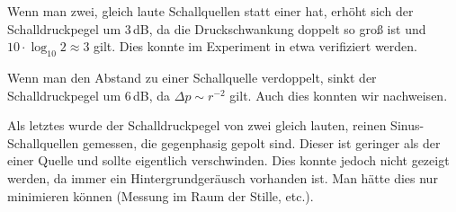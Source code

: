 \documentclass[12pt,a4paper,headinclude,bibtotoc]{scrartcl}
\begin{document}
Wenn man zwei, gleich laute Schallquellen statt einer hat, erhöht sich der Schalldruckpegel um $3\,$dB, da die Druckschwankung doppelt so groß ist und $10\cdot\log_{10} 2 \approx 3$ gilt.
Dies konnte im Experiment in etwa verifiziert werden.

Wenn man den Abstand zu einer Schallquelle verdoppelt, sinkt der Schalldruckpegel um $6\,$dB, da $\Delta p \sim r^{-2}$ gilt.
Auch dies konnten wir nachweisen.

Als letztes wurde der Schalldruckpegel von zwei gleich lauten, reinen Sinus-Schallquellen gemessen, die gegenphasig gepolt sind.
Dieser ist geringer als der einer Quelle und sollte eigentlich verschwinden.
Dies konnte jedoch nicht gezeigt werden, da immer ein Hintergrundgeräusch vorhanden ist.
Man hätte dies nur minimieren können (Messung im Raum der Stille, etc.).
\end{document}
